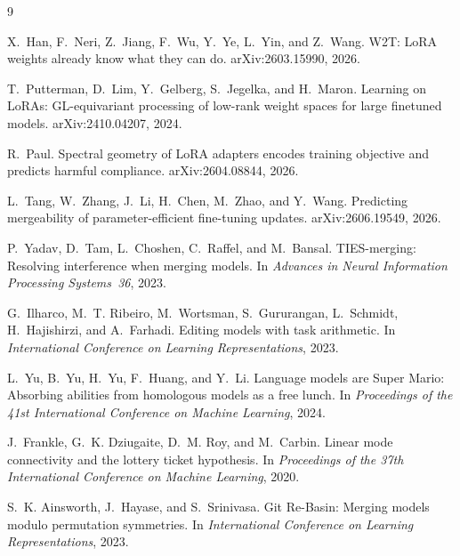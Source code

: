 \documentclass[10pt]{article}
\begin{document}
\begin{thebibliography}{9}

X.~Han, F.~Neri, Z.~Jiang, F.~Wu, Y.~Ye, L.~Yin, and Z.~Wang.
W2T: LoRA weights already know what they can do.
arXiv:2603.15990, 2026.

T.~Putterman, D.~Lim, Y.~Gelberg, S.~Jegelka, and H.~Maron.
Learning on LoRAs: GL-equivariant processing of low-rank weight spaces for
large finetuned models.
arXiv:2410.04207, 2024.

R.~Paul.
Spectral geometry of LoRA adapters encodes training objective and predicts
harmful compliance.
arXiv:2604.08844, 2026.

L.~Tang, W.~Zhang, J.~Li, H.~Chen, M.~Zhao, and Y.~Wang.
Predicting mergeability of parameter-efficient fine-tuning updates.
arXiv:2606.19549, 2026.

P.~Yadav, D.~Tam, L.~Choshen, C.~Raffel, and M.~Bansal.
TIES-merging: Resolving interference when merging models.
In \emph{Advances in Neural Information Processing Systems~36}, 2023.

G.~Ilharco, M.~T. Ribeiro, M.~Wortsman, S.~Gururangan, L.~Schmidt,
H.~Hajishirzi, and A.~Farhadi.
Editing models with task arithmetic.
In \emph{International Conference on Learning Representations}, 2023.

L.~Yu, B.~Yu, H.~Yu, F.~Huang, and Y.~Li.
Language models are Super Mario: Absorbing abilities from homologous
models as a free lunch.
In \emph{Proceedings of the 41st International Conference on Machine
Learning}, 2024.

J.~Frankle, G.~K. Dziugaite, D.~M. Roy, and M.~Carbin.
Linear mode connectivity and the lottery ticket hypothesis.
In \emph{Proceedings of the 37th International Conference on Machine
Learning}, 2020.

S.~K. Ainsworth, J.~Hayase, and S.~Srinivasa.
Git Re-Basin: Merging models modulo permutation symmetries.
In \emph{International Conference on Learning Representations}, 2023.

\end{thebibliography}
\end{document}
